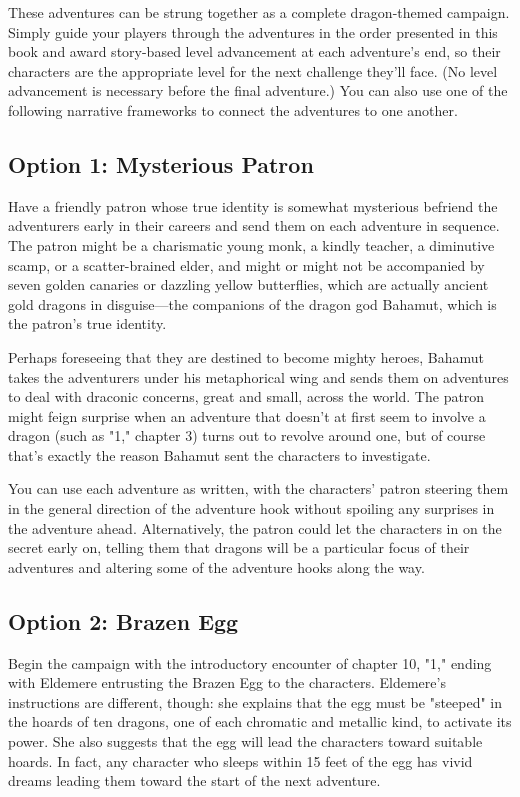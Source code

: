\documentclass[letterpaper, 11pt, twocolumn]{dndbook}
\begin{document}
These adventures can be strung together as a complete dragon-themed campaign. Simply guide your players through the adventures in the order presented in this book and award story-based level advancement at each adventure's end, so their characters are the appropriate level for the next challenge they'll face. (No level advancement is necessary before the final adventure.) You can also use one of the following narrative frameworks to connect the adventures to one another.

\subsection{Option 1: Mysterious Patron}

Have a friendly patron whose true identity is somewhat mysterious befriend the adventurers early in their careers and send them on each adventure in sequence. The patron might be a charismatic young monk, a kindly teacher, a diminutive scamp, or a scatter-brained elder, and might or might not be accompanied by seven golden canaries or dazzling yellow butterflies, which are actually ancient gold dragons in disguise---the companions of the dragon god Bahamut, which is the patron's true identity.

Perhaps foreseeing that they are destined to become mighty heroes, Bahamut takes the adventurers under his metaphorical wing and sends them on adventures to deal with draconic concerns, great and small, across the world. The patron might feign surprise when an adventure that doesn't at first seem to involve a dragon (such as "1," chapter 3) turns out to revolve around one, but of course that's exactly the reason Bahamut sent the characters to investigate.

You can use each adventure as written, with the characters' patron steering them in the general direction of the adventure hook without spoiling any surprises in the adventure ahead. Alternatively, the patron could let the characters in on the secret early on, telling them that dragons will be a particular focus of their adventures and altering some of the adventure hooks along the way.

\subsection{Option 2: Brazen Egg}

Begin the campaign with the introductory encounter of chapter 10, "1," ending with Eldemere entrusting the Brazen Egg to the characters. Eldemere's instructions are different, though: she explains that the egg must be "steeped" in the hoards of ten dragons, one of each chromatic and metallic kind, to activate its power. She also suggests that the egg will lead the characters toward suitable hoards. In fact, any character who sleeps within 15 feet of the egg has vivid dreams leading them toward the start of the next adventure.
\end{document}
